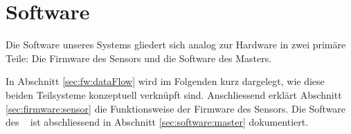 \chapter{Software}
\label{chap:software}

Die  Software   unseres  Systems   gliedert  sich   analog  zur   Hardware  in
zwei  prim\"are  Teile: Die   Firmware  des  Sensors  und   die  Software  des
Masters.

In  Abschnitt   \ref{sec:fw:dataFlow}  wird   im  Folgenden   kurz  dargelegt,
wie  diese  beiden  Teilsysteme  konzeptuell  verkn\"upft  sind. Anschliessend
erkl\"art Abschnitt \ref{sec:firmware:sensor}  die Funktionsweise der Firmware
des  Sensors. Die   Software  des   \Raspi~ ist  abschliessend   in  Abschnitt
\ref{sec:software:master} dokumentiert.


